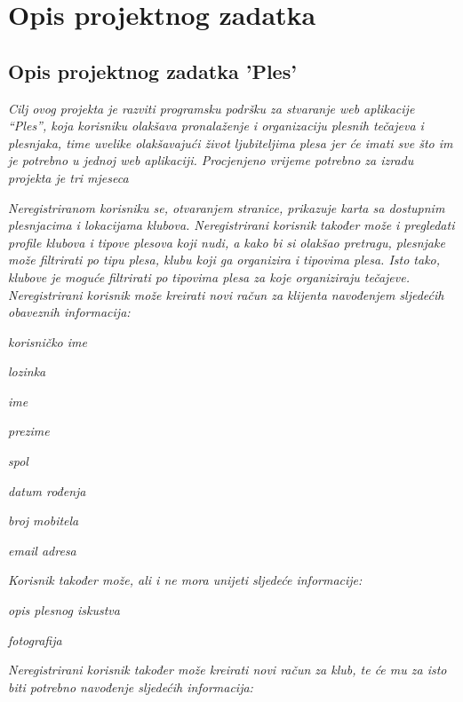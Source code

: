 \chapter{Opis projektnog zadatka}
\usepackage{graphicx}
\section{Opis projektnog zadatka 'Ples'}

\textit{Cilj ovog projekta je razviti programsku podršku za stvaranje web aplikacije “Ples”, koja korisniku olakšava pronalaženje i organizaciju plesnih tečajeva i plesnjaka, time uvelike olakšavajući život ljubiteljima plesa jer će imati sve što im je potrebno u jednoj web aplikaciji. Procjenjeno vrijeme potrebno za izradu projekta je tri mjeseca}

\textit{Neregistriranom korisniku se, otvaranjem stranice, prikazuje karta sa dostupnim plesnjacima i lokacijama klubova. Neregistrirani korisnik također može i pregledati profile klubova i tipove plesova koji nudi, a kako bi si olakšao pretragu, plesnjake može filtrirati po tipu plesa, klubu koji ga organizira i tipovima plesa. Isto tako, klubove je moguće filtrirati po tipovima plesa za koje organiziraju tečajeve. 
	Neregistrirani korisnik može kreirati novi račun za klijenta navođenjem sljedećih obaveznih informacija:
}
\begin{packed_item}
	\item \textit{korisničko ime}
	\item \textit{lozinka}
	\item \textit{ime}
	\item \textit{prezime}
	\item \textit{spol}
	\item \textit{datum rođenja}
	\item \textit{broj mobitela}
	\item \textit{email adresa}
\end{packed_item}

\textit{Korisnik također može, ali i ne mora unijeti sljedeće informacije:}

\begin{packed_item}
	\item \textit{opis plesnog iskustva}
	\item \textit{fotografija}
\end{packed_item}

\textit{Neregistrirani korisnik također može kreirati novi račun za klub, te će mu za isto biti potrebno navođenje sljedećih informacija:}


